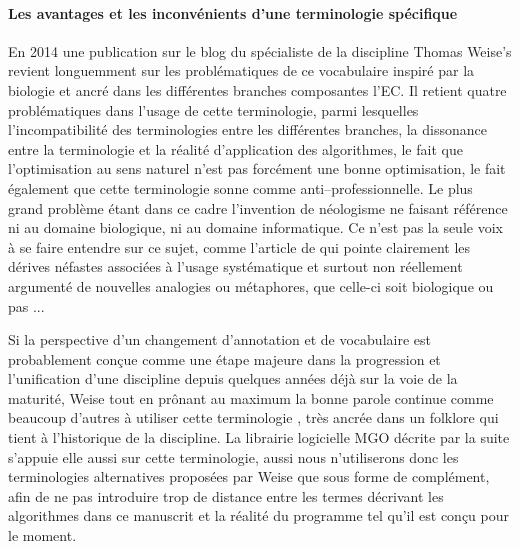 \paragraph{Les avantages et les inconvénients d'une terminologie spécifique}

En 2014 une publication sur le blog du spécialiste de la discipline Thomas Weise's revient longuemment sur les problématiques de ce vocabulaire inspiré par la biologie et ancré dans les différentes branches composantes l'EC. Il retient quatre problématiques dans l'usage de cette terminologie, parmi lesquelles l'incompatibilité des terminologies entre les différentes branches, la dissonance entre la terminologie et la réalité d'application des algorithmes, le fait que l'optimisation au sens naturel n'est pas forcément une bonne optimisation, le fait également que cette terminologie sonne comme anti--professionnelle. Le plus grand problème étant dans ce cadre l'invention de néologisme ne faisant référence ni au domaine biologique, ni au domaine informatique. Ce n'est pas la seule voix à se faire entendre sur ce sujet, comme l'article de \textcite{Sorensen2013b} qui pointe clairement les dérives néfastes associées à l'usage systématique et surtout non réellement argumenté de nouvelles analogies ou métaphores, que celle-ci soit biologique ou pas ...

Si la perspective d'un changement d'annotation et de vocabulaire est probablement conçue comme une étape majeure dans la progression et l'unification d'une discipline depuis quelques années déjà sur la voie de la maturité, Weise tout en prônant au maximum la bonne parole continue comme beaucoup d'autres à utiliser cette terminologie \autocite{Weise2011}, très ancrée dans un folklore qui tient à l'historique de la discipline. La librairie logicielle MGO décrite par la suite s'appuie elle aussi sur cette terminologie, aussi nous n'utiliserons donc les terminologies alternatives proposées par Weise que sous forme de complément, afin de ne pas introduire trop de distance entre les termes décrivant les algorithmes dans ce manuscrit et la réalité du programme tel qu'il est conçu pour le moment.

